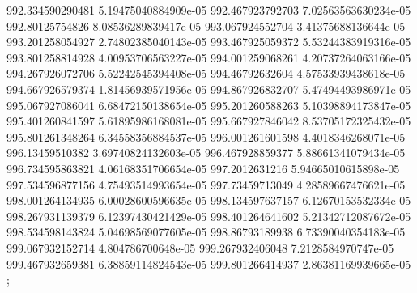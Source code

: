 {992.334590290481 5.19475040884909e-05
992.467923792703 7.02563563630234e-05
992.80125754826 8.08536289839417e-05
993.067924552704 3.41375688136644e-05
993.201258054927 2.74802385040143e-05
993.467925059372 5.53244383919316e-05
993.801258814928 4.00953706563227e-05
994.001259068261 4.20737264063166e-05
994.267926072706 5.52242545394408e-05
994.46792632604 4.57533939438618e-05
994.667926579374 1.81456939571956e-05
994.867926832707 5.47494493986971e-05
995.067927086041 6.68472150138654e-05
995.201260588263 5.10398894173847e-05
995.401260841597 5.61895986168081e-05
995.667927846042 8.53705172325432e-05
995.801261348264 6.34558356884537e-05
996.001261601598 4.4018346268071e-05
996.13459510382 3.69740824132603e-05
996.467928859377 5.88661341079434e-05
996.734595863821 4.06168351706654e-05
997.2012631216 5.94665010615898e-05
997.534596877156 4.75493514993654e-05
997.73459713049 4.28589667476621e-05
998.001264134935 6.00028600596635e-05
998.134597637157 6.12670153532334e-05
998.267931139379 6.12397430421429e-05
998.401264641602 5.21342712087672e-05
998.534598143824 5.04698569077605e-05
998.86793189938 6.73390040354183e-05
999.067932152714 4.804786700648e-05
999.267932406048 7.2128584970747e-05
999.467932659381 6.38859114824543e-05
999.801266414937 2.86381169939665e-05
};